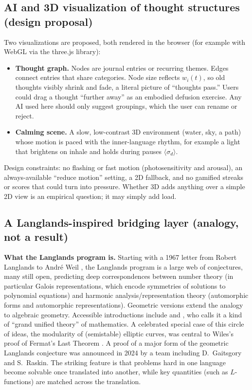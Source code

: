 \documentclass[11pt]{article}
\newcommand{\pause}[1]{\langle\sigma_{#1}\rangle}
\begin{document}
\subsection{AI and 3D visualization of thought structures (design proposal)}
Two visualizations are proposed, both rendered in the browser (for example with WebGL via the three.js library):
\begin{itemize}
\item \textbf{Thought graph.} Nodes are journal entries or recurring themes. Edges connect entries that share categories. Node size reflects $w_i(t)$, so old thoughts visibly shrink and fade, a literal picture of ``thoughts pass.'' Users could drag a thought ``further away'' as an embodied defusion exercise. Any AI used here should only suggest groupings, which the user can rename or reject.
\item \textbf{Calming scene.} A slow, low-contrast 3D environment (water, sky, a path) whose motion is paced with the inner-language rhythm, for example a light that brightens on inhale and holds during pauses $\pause{d}$.
\end{itemize}
Design constraints: no flashing or fast motion (photosensitivity and arousal), an always-available ``reduce motion'' setting, a 2D fallback, and no gamified streaks or scores that could turn into pressure. Whether 3D adds anything over a simple 2D view is an empirical question; it may simply add load.

\subsection{A Langlands-inspired bridging layer (analogy, not a result)}
\textbf{What the Langlands program is.} Starting with a 1967 letter from Robert Langlands to Andr\'e Weil \citep{langlands1967}, the Langlands program is a large web of conjectures, many still open, predicting deep correspondences between number theory (in particular Galois representations, which encode symmetries of solutions to polynomial equations) and harmonic analysis/representation theory (automorphic forms and automorphic representations). Geometric versions extend the analogy to algebraic geometry. Accessible introductions include \citet{gelbart1984} and \citet{frenkel2013}, who calls it a kind of ``grand unified theory'' of mathematics. A celebrated special case of this circle of ideas, the modularity of (semistable) elliptic curves, was central to Wiles's proof of Fermat's Last Theorem \citep{wiles1995}. A proof of a major form of the geometric Langlands conjecture was announced in 2024 by a team including D.~Gaitsgory and S.~Raskin. The striking feature is that problems hard in one language become solvable once translated into another, while key quantities (such as $L$-functions) are matched across the translation.
\end{document}
